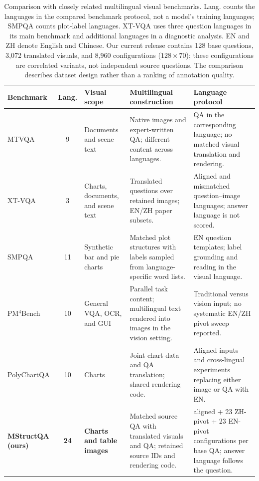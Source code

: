 \begin{table}[t]
\centering
\small
\setlength{\tabcolsep}{4pt}
\renewcommand{\arraystretch}{1.12}
\begin{tabularx}{\textwidth}{@{}p{}c
  >{\raggedright\arraybackslash}p{}
  >{\raggedright\arraybackslash}X
  >{\raggedright\arraybackslash}X@{}}
\toprule
Benchmark & Lang. & Visual scope & Multilingual construction & Language protocol \\
\midrule
MTVQA\newline
& 9 & Documents and scene text
& Native images and expert-written QA; different content across languages.
& QA in the corresponding language; no matched visual translation and rendering. \\
\addlinespace[3pt]
XT-VQA\newline
& 3 & Charts, documents, and scene text
& Translated questions over retained images; EN/ZH paper subsets.
& Aligned and mismatched question--image languages; answer language is not scored. \\
\addlinespace[3pt]
SMPQA\newline
& 11 & Synthetic bar and pie charts
& Matched plot structures with labels sampled from language-specific word lists.
& EN question templates; label grounding and reading in the visual language. \\
\addlinespace[3pt]
PM$^{4}$Bench\newline
& 10 & General VQA, OCR, and GUI
& Parallel task content; multilingual text rendered into images in the vision setting.
& Traditional versus vision input; no systematic EN/ZH pivot sweep reported. \\
\addlinespace[3pt]
PolyChartQA\newline
& 10 & Charts
& Joint chart-data and QA translation; shared rendering code.
& Aligned inputs and cross-lingual experiments replacing either image or QA with EN. \\
\midrule
\textbf{MStructQA (ours)}
& \textbf{24} & \textbf{Charts and table images}
& Matched source QA with translated visuals and QA; retained source IDs and rendering code.
& 24 aligned + 23 ZH-pivot + 23 EN-pivot configurations per base QA; answer language follows the question. \\
\bottomrule
\end{tabularx}
\caption{Comparison with closely related multilingual visual benchmarks.
Lang. counts the languages in the compared benchmark protocol, not a model's
training languages; SMPQA counts plot-label languages. XT-VQA uses three
question languages in its main benchmark and additional languages in a
diagnostic analysis. EN and ZH denote English and Chinese. Our current release
contains 128 base questions, 3,072 translated visuals, and 8,960 configurations
($128\times70$); these configurations are correlated variants, not independent
source questions. The comparison describes dataset design rather than a
ranking of annotation quality.}
\label{tab:benchmark-comparison}
\end{table}
